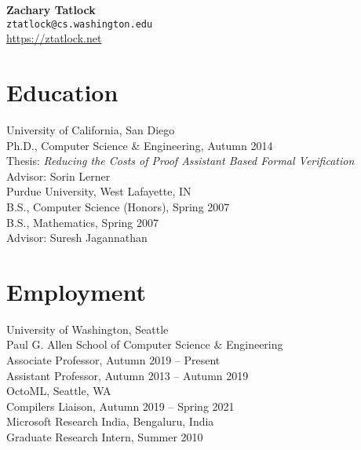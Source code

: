 \documentclass[10pt]{article}
\begin{document}
{\LARGE \textbf{Zachary Tatlock}} \\
\texttt{ztatlock@cs.washington.edu} \\
\url{https://ztatlock.net}

\section*{Education}

University of California, San Diego \\
Ph.D., Computer Science \& Engineering, Autumn 2014 \\
Thesis: \textit{Reducing the Costs of Proof Assistant Based Formal Verification} \\
Advisor: Sorin Lerner \\

Purdue University, West Lafayette, IN \\
B.S., Computer Science (Honors), Spring 2007 \\
B.S., Mathematics, Spring 2007 \\
Advisor: Suresh Jagannathan


\section*{Employment}

University of Washington, Seattle \\
Paul G. Allen School of Computer Science \& Engineering \\
Associate Professor, Autumn 2019 -- Present \\
Assistant Professor, Autumn 2013 -- Autumn 2019 \\

OctoML, Seattle, WA \\
Compilers Liaison, Autumn 2019 -- Spring 2021 \\


Microsoft Research India, Bengaluru, India \\
Graduate Research Intern, Summer 2010 %
\end{document}
